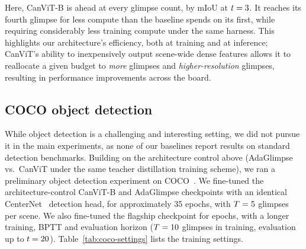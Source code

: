 \documentclass{article}
\begin{document}
Here, CanViT-B is ahead at every glimpse count, by \ctrlLead{} mIoU at $t = 3$.
It reaches its fourth glimpse for less compute than the baseline spends on its first, while requiring considerably less training compute under the same harness.
This highlights our architecture's efficiency, both at training and at inference; CanViT's ability to inexpensively output scene-wide dense features allows it to reallocate a given budget to \emph{more} glimpses and \emph{higher-resolution} glimpses, resulting in performance improvements across the board.

\FloatBarrier
\subsection{COCO object detection}
\label{supp:coco-detection}


While object detection is a challenging and interesting setting, we did not pursue it in the main experiments, as none of our baselines report results on standard detection benchmarks.
Building on the architecture control above (AdaGlimpse vs.\ CanViT under the same teacher distillation training scheme), we ran a preliminary object detection experiment on COCO~\cite{linMicrosoftCOCOCommon2014}.
We fine-tuned the architecture-control CanViT-B and AdaGlimpse checkpoints with an identical CenterNet~\cite{zhouObjectsPoints2019} detection head, for approximately 35 epochs, with $T = 5$ glimpses per scene.
We also fine-tuned the flagship checkpoint for \cocoFlagshipEpochs{} epochs, with a longer training, BPTT and evaluation horizon ($T = 10$ glimpses in training, evaluation up to $t = 20$). Table~\ref{tab:coco-settings} lists the training settings.
\end{document}
